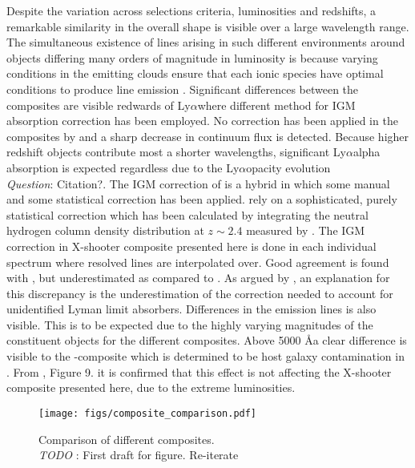 \documentclass{aa}    %
\newcommand{\figlabel}[1]{\label{fig:#1}}
\newcommand{\tablabel}[1]{\label{tab:#1}}
\newcommand{\lya}{Ly$\alpha$}
\newcommand{\todo}[3]{{\color{#2}\emph{#1}: #3}}
\newcommand{\jstodo}[1]{\todo{ \\TODO }{green}{#1}}
\newcommand{\qtodo}[1]{\todo{\\ Question}{red}{#1}}
\begin{document}
Despite the variation across selections criteria, luminosities and redshifts, a remarkable similarity in the overall shape is visible over a large wavelength range. The simultaneous existence of lines arising in such different environments around objects differing many orders of magnitude in luminosity is because varying conditions in the emitting clouds ensure that each ionic species have optimal conditions to produce line emission \citep{Baldwin1995}.  Significant differences between the composites are visible redwards of \lya where different method for IGM absorption correction has been employed. No correction has been applied in the composites by \cite{Francis1991, VandenBerk2001} and a sharp decrease in continuum flux is detected. Because higher redshift objects contribute most a shorter wavelengths, significant \lya alpha absorption is expected regardless due to the \lya opacity evolution \qtodo{Citation?}. The IGM correction of \cite{Telfer2002} is a hybrid in which some manual and some statistical correction has been applied. \cite{Lusso2015} rely on a sophisticated, purely statistical correction which has been calculated by integrating the neutral hydrogen column density distribution at $z \sim 2.4$ measured by \cite{Prochaska2014b}. The IGM correction in X-shooter composite presented here is done in each individual spectrum where resolved lines are interpolated over. Good agreement is found with \cite{Telfer2002}, but underestimated as compared to \cite{Lusso2015}. As argued by \cite{Lusso2015}, an explanation for this discrepancy is the underestimation of the correction needed to account for unidentified Lyman limit absorbers. Differences in the emission lines is also visible. This is to be expected due to the highly varying magnitudes of the constituent objects for the different composites. 
Above 5000 \AA a clear difference is visible to the \cite{VandenBerk2001}-composite which is determined to be host galaxy contamination in \cite{Glikman2006}. From \cite{Shen2011}, Figure 9. it is confirmed that this effect is not affecting the X-shooter composite presented here, due to the extreme luminosities. 
 \begin{figure*}[hbtp]
   \centering
   \texttt{[image: figs/composite\_comparison.pdf]}
   \caption[]{Comparison of different composites. \jstodo{First draft for figure. Re-iterate}}
  \figlabel{composite_comparison}
 \end{figure*}
  \tablabel{comparison}
 
\end{document}
